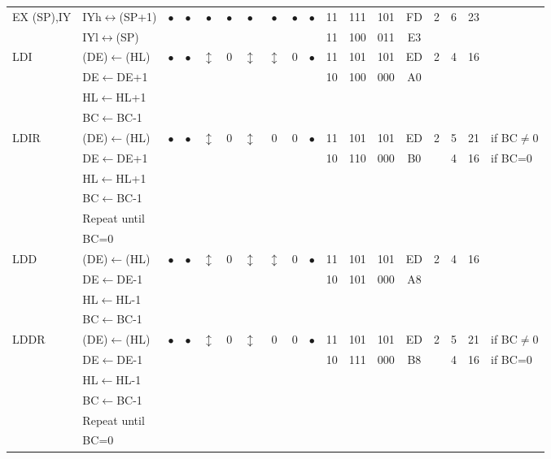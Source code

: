 \documentclass[oneside,a4paper]{book}
\begin{document}
{\begin{tabular}{llcccccccccccccccl}
		EX (SP),IY & IYh$\leftrightarrow$(SP+1) & 
			$\bullet$ & $\bullet$ & $\bullet$ & $\bullet$ & $\bullet$ & $\bullet$ & $\bullet$ & $\bullet$ & 
			11 & 111 & 101 & 
			FD & 2 & 
			6 & 23 & \\
		& IYl$\leftrightarrow$(SP) & \multicolumn{8}{c}{} & 11 & 100 & 011 & E3 & & \\[4pt]

		LDI & (DE)$\leftarrow$(HL) & 
			$\bullet$ & $\bullet$ & 
				$\updownarrow$\footnotemark[4] & 0 & 
				$\updownarrow$\footnotemark[4] & 
				$\updownarrow$\footnotemark[1] & 0 & $\bullet$ & 
			11 & 101 & 101 & 
			ED & 2 & 
			4 & 16 \\ 
		& DE$\leftarrow$DE+1 & \multicolumn{8}{c}{} & 10 & 100 & 000 & A0 & & & \\ 
		& HL$\leftarrow$HL+1 & \\
		& BC$\leftarrow$BC-1 & \\ [4pt]

		LDIR & (DE)$\leftarrow$(HL) & 
			$\bullet$ & $\bullet$ &
				$\updownarrow$\footnotemark[4] & 0 & 
				$\updownarrow$\footnotemark[4] & 
				0\footnotemark[2] & 0 & $\bullet$ & 
			11 & 101 & 101 & 
			ED & 2 & 
			5 & 21 & {if BC$\not=$0} \\
		& DE$\leftarrow$DE+1 & \multicolumn{8}{c}{} & 10 & 110 & 000 & B0 & & 4 & 16 & {if BC=0} \\
		& HL$\leftarrow$HL+1 & \\
		& BC$\leftarrow$BC-1 & \\ 
		& Repeat until & \\ 
		& BC=0 & \\[4pt]

		LDD & (DE)$\leftarrow$(HL) & 
			$\bullet$ & $\bullet$ & 
				$\updownarrow$\footnotemark[4] & 0 & 
				$\updownarrow$\footnotemark[4] & 
				$\updownarrow$\footnotemark[1] & 0 & $\bullet$ & 
			11 & 101 & 101 & 
			ED & 2 & 
			4 & 16 & \\ 
		& DE$\leftarrow$DE-1 & \multicolumn{8}{c}{} & 10 & 101 & 000 & A8 & & \\ 
		& HL$\leftarrow$HL-1 & \\
		& BC$\leftarrow$BC-1 & \\[4pt]

		LDDR & (DE)$\leftarrow$(HL) & 
			$\bullet$ & $\bullet$ & 
				$\updownarrow$\footnotemark[4] & 0 & 
				$\updownarrow$\footnotemark[4] & 
				0\footnotemark[2] & 0 & $\bullet$ & 
			11 & 101 & 101 & 
			ED & 2 & 
			5 & 21 & {if BC$\not=$0} \\ 
		& DE$\leftarrow$DE-1 & \multicolumn{8}{c}{} & 10 & 111 & 000 & B8 & & 4 & 16 & {if BC=0} \\
		& HL$\leftarrow$HL-1 & \\
		& BC$\leftarrow$BC-1 & \\ 
		& Repeat until & \\ 
		& BC=0 & \\[4pt]


\end{tabular}}
\end{document}
